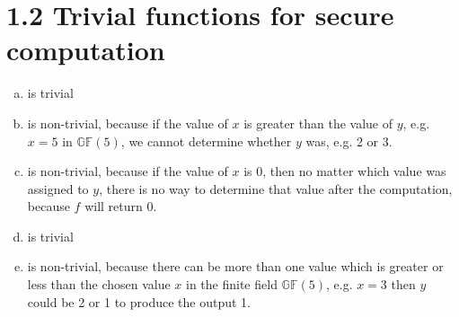 \documentclass{article}
\begin{document}
	\section*{1.2 Trivial functions for secure computation}
	\begin{adjustwidth}{2em}{2em}
		\begin{enumerate}[a)]
			\item is trivial
			\item is non-trivial, because if the value of $x$ is greater than the value of $y$, e.g. $x = 5$ in $\mathbb{G}\mathbb{F}(5)$, we cannot determine whether $y$ was, e.g. 2 or 3.
			\item is non-trivial, because if the value of $x$ is 0, then no matter which value was assigned to $y$, there is no way to determine that value after the computation, because $f$ will return 0.
			\item is trivial
			\item is non-trivial, because there can be more than one value which is greater or less than the chosen value $x$ in the finite field $\mathbb{G}\mathbb{F}(5)$, e.g. $x=3$ then $y$ could be 2 or 1 to produce the output 1.
		\end{enumerate}
	\end{adjustwidth}
	
\end{document}
